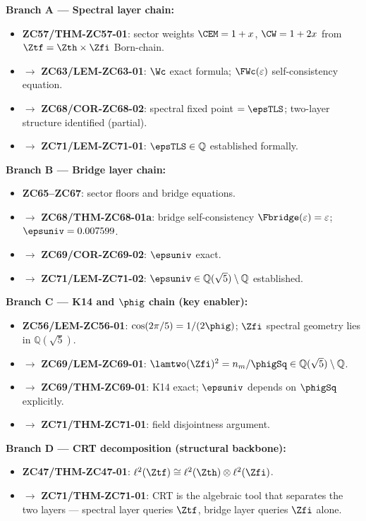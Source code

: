 \documentclass[12pt, a4paper]{article}
\begin{document}
\begin{genealogybox}[title={How ZC71's Key Objects Trace Back}]

\textbf{Branch A --- Spectral layer chain:}
\begin{itemize}[leftmargin=2em, noitemsep]
  \item \textbf{ZC57/THM-ZC57-01}: sector weights $\CEM = 1+x$,
    $\CW = 1+2x$ from $\Ztf = \Zth\times\Zfi$ Born-chain.
  \item $\to$ \textbf{ZC63/LEM-ZC63-01}: $\Wc$ exact formula;
    $\FWc(\varepsilon)$ self-consistency equation.
  \item $\to$ \textbf{ZC68/COR-ZC68-02}: spectral fixed point
    $= \epsTLS$; two-layer structure identified (partial).
  \item $\to$ \textbf{ZC71/LEM-ZC71-01}:
    $\epsTLS\in\mathbb{Q}$ established formally.
\end{itemize}

\textbf{Branch B --- Bridge layer chain:}
\begin{itemize}[leftmargin=2em, noitemsep]
  \item \textbf{ZC65--ZC67}: sector floors and bridge equations.
  \item $\to$ \textbf{ZC68/THM-ZC68-01a}: bridge self-consistency
    $\Fbridge(\varepsilon) = \varepsilon$; $\epsuniv = 0.007599$.
  \item $\to$ \textbf{ZC69/COR-ZC69-02}: $\epsuniv$ exact.
  \item $\to$ \textbf{ZC71/LEM-ZC71-02}:
    $\epsuniv\in\mathbb{Q}(\sqrt{5})\setminus\mathbb{Q}$ established.
\end{itemize}

\textbf{Branch C --- K14 and $\phig$ chain (key enabler):}
\begin{itemize}[leftmargin=2em, noitemsep]
  \item \textbf{ZC56/LEM-ZC56-01}: $\cos(2\pi/5) = 1/(2\phig)$;
    $\Zfi$ spectral geometry lies in $\mathbb{Q}(\sqrt{5})$.
  \item $\to$ \textbf{ZC69/LEM-ZC69-01}: $\lamtwo(\Zfi)^2 = n_m/\phigSq
    \in\mathbb{Q}(\sqrt{5})\setminus\mathbb{Q}$.
  \item $\to$ \textbf{ZC69/THM-ZC69-01}: K14 exact;
    $\epsuniv$ depends on $\phigSq$ explicitly.
  \item $\to$ \textbf{ZC71/THM-ZC71-01}: field disjointness argument.
\end{itemize}

\textbf{Branch D --- CRT decomposition (structural backbone):}
\begin{itemize}[leftmargin=2em, noitemsep]
  \item \textbf{ZC47/THM-ZC47-01}: $\ell^2(\Ztf) \cong
    \ell^2(\Zth)\otimes\ell^2(\Zfi)$.
  \item $\to$ \textbf{ZC71/THM-ZC71-01}: CRT is the algebraic tool
    that separates the two layers --- spectral layer queries $\Ztf$,
    bridge layer queries $\Zfi$ alone.
\end{itemize}


\end{genealogybox}
\end{document}
